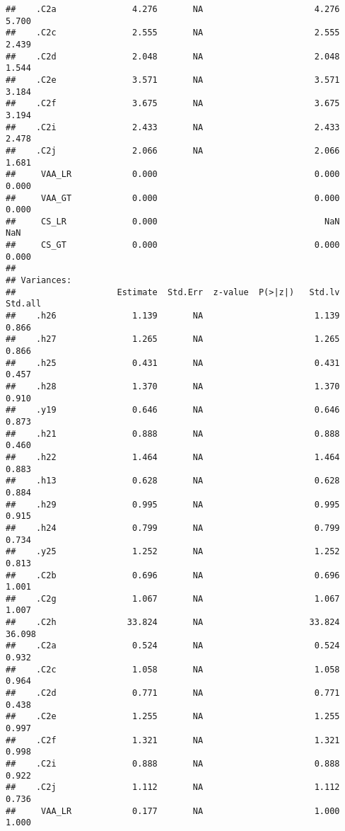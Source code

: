 \documentclass[
]{article}
\begin{document}
\begin{verbatim}
##    .C2a               4.276       NA                      4.276    5.700
##    .C2c               2.555       NA                      2.555    2.439
##    .C2d               2.048       NA                      2.048    1.544
##    .C2e               3.571       NA                      3.571    3.184
##    .C2f               3.675       NA                      3.675    3.194
##    .C2i               2.433       NA                      2.433    2.478
##    .C2j               2.066       NA                      2.066    1.681
##     VAA_LR            0.000                               0.000    0.000
##     VAA_GT            0.000                               0.000    0.000
##     CS_LR             0.000                                 NaN      NaN
##     CS_GT             0.000                               0.000    0.000
## 
## Variances:
##                    Estimate  Std.Err  z-value  P(>|z|)   Std.lv  Std.all
##    .h26               1.139       NA                      1.139    0.866
##    .h27               1.265       NA                      1.265    0.866
##    .h25               0.431       NA                      0.431    0.457
##    .h28               1.370       NA                      1.370    0.910
##    .y19               0.646       NA                      0.646    0.873
##    .h21               0.888       NA                      0.888    0.460
##    .h22               1.464       NA                      1.464    0.883
##    .h13               0.628       NA                      0.628    0.884
##    .h29               0.995       NA                      0.995    0.915
##    .h24               0.799       NA                      0.799    0.734
##    .y25               1.252       NA                      1.252    0.813
##    .C2b               0.696       NA                      0.696    1.001
##    .C2g               1.067       NA                      1.067    1.007
##    .C2h              33.824       NA                     33.824   36.098
##    .C2a               0.524       NA                      0.524    0.932
##    .C2c               1.058       NA                      1.058    0.964
##    .C2d               0.771       NA                      0.771    0.438
##    .C2e               1.255       NA                      1.255    0.997
##    .C2f               1.321       NA                      1.321    0.998
##    .C2i               0.888       NA                      0.888    0.922
##    .C2j               1.112       NA                      1.112    0.736
##     VAA_LR            0.177       NA                      1.000    1.000

\end{verbatim}
\end{document}
